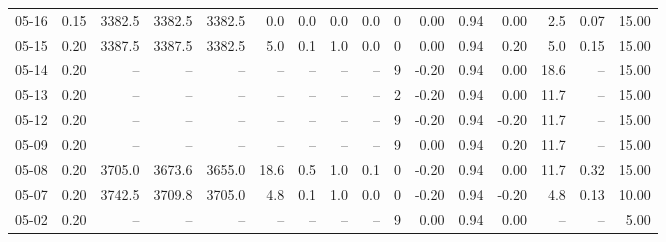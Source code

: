 \begin{threeparttable}
{\begin{tabular}{lrrrrrrrrrrrrrrr}
  05-16 &     0.15 & 3382.5 & 3382.5 & 3382.5 &        0.0 &            0.0 &                      0.0 &                 0.0 &              0 &       0.00 &      0.94 &           0.00 &              2.5 &            0.07 &                  15.00 \\
  05-15 &     0.20 & 3387.5 & 3387.5 & 3382.5 &        5.0 &            0.1 &                      1.0 &                 0.0 &              0 &       0.00 &      0.94 &           0.20 &              5.0 &            0.15 &                  15.00 \\
  05-14 &     0.20 &     -- &     -- &     -- &         -- &             -- &                       -- &                  -- &              9 &      -0.20 &      0.94 &           0.00 &             18.6 &              -- &                  15.00 \\
  05-13 &     0.20 &     -- &     -- &     -- &         -- &             -- &                       -- &                  -- &              2 &      -0.20 &      0.94 &           0.00 &             11.7 &              -- &                  15.00 \\
  05-12 &     0.20 &     -- &     -- &     -- &         -- &             -- &                       -- &                  -- &              9 &      -0.20 &      0.94 &          -0.20 &             11.7 &              -- &                  15.00 \\
  05-09 &     0.20 &     -- &     -- &     -- &         -- &             -- &                       -- &                  -- &              9 &       0.00 &      0.94 &           0.20 &             11.7 &              -- &                  15.00 \\
  05-08 &     0.20 & 3705.0 & 3673.6 & 3655.0 &       18.6 &            0.5 &                      1.0 &                 0.1 &              0 &      -0.20 &      0.94 &           0.00 &             11.7 &            0.32 &                  15.00 \\
  05-07 &     0.20 & 3742.5 & 3709.8 & 3705.0 &        4.8 &            0.1 &                      1.0 &                 0.0 &              0 &      -0.20 &      0.94 &          -0.20 &              4.8 &            0.13 &                  10.00 \\
  05-02 &     0.20 &     -- &     -- &     -- &         -- &             -- &                       -- &                  -- &              9 &       0.00 &      0.94 &           0.00 &               -- &              -- &                   5.00 \\

\end{tabular}}
\end{threeparttable}
